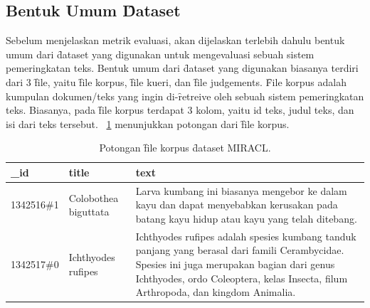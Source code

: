     \subsection{Bentuk Umum \f{Dataset}}
    \label{sec:dataset-umum}
    Sebelum menjelaskan metrik evaluasi, akan dijelaskan terlebih dahulu bentuk umum dari \f{dataset} yang digunakan untuk mengevaluasi sebuah sistem pemeringkatan teks. Bentuk umum dari \f{dataset} yang digunakan biasanya terdiri dari 3 \f{file}, yaitu \f{file} korpus, \f{file} kueri, dan \f{file judgements}. \f{File} korpus adalah kumpulan dokumen/teks yang ingin di-\f{retreive} oleh sebuah sistem pemeringkatan teks. Biasanya, pada \f{file} korpus terdapat 3 kolom, yaitu id teks, judul teks, dan isi dari teks tersebut. \tab~\ref{tab:contoh-file-korpus} menunjukkan potongan dari \f{file} korpus.
    \begin{table}
        \centering
        \caption{Potongan \f{file} korpus \f{dataset} MIRACL.}
        \label{tab:contoh-file-korpus}
        \begin{tabular}{|l|l|p{}|}
            \hline
            \textbf{\_id}    & \textbf{title}             & \textbf{text}                                                                                                 \\ \hline
            1342516\#1  & Colobothea biguttata & Larva kumbang ini biasanya mengebor ke dalam kayu dan dapat menyebabkan kerusakan pada batang kayu hidup atau kayu yang telah ditebang. \\ \hline
            1342517\#0  & Ichthyodes rufipes  & Ichthyodes rufipes adalah spesies kumbang tanduk panjang yang berasal dari famili Cerambycidae. Spesies ini juga merupakan bagian dari genus Ichthyodes, ordo Coleoptera, kelas Insecta, filum Arthropoda, dan kingdom Animalia. \\ \hline
        \end{tabular}
    \end{table}

